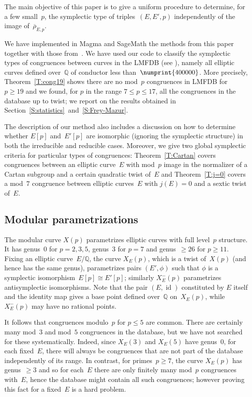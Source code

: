 \documentclass[12pt]{amsart}
\newcommand{\Q}{\mathbb{Q}}
\newcommand{\rhobar}{{\overline{\rho}}}
\DeclareMathOperator{\id}{id}
\numberwithin{equation}{section}
\theoremstyle{definition}
\theoremstyle{remark}
\newcommand{\Sage}{{\sc SageMath}}
\newcommand{\Magma}{{\sc Magma}}
\begin{document}
The main objective of this paper is to give a uniform procedure to
determine, for a few small~$p$, the symplectic type of
triples~$(E,E',p)$ independently of the image of~$\rhobar_{E,p}$.

We have implemented in {\Magma} \cite{magma} and {\Sage} \cite{sage}
the methods from this paper together with those from~\cite{FKSym}. We
have used our code to classify the symplectic types of congruences
between curves in the LMFDB (see \cite{lmfdb}), namely all elliptic
curves defined over~$\Q$ of conductor less
than~$\numprint{400000}$. More precisely, Theorem~\ref{T:cong19} shows
there are no mod~$p$ congruences in LMFDB for $p \geq 19$ and we
found, for $p$ in the range $7 \leq p \leq 17$, all the congruences in
the database up to twist; we report on the results obtained in
Section~\ref{S:statistics}~and~\ref{S:Frey-Mazur}.

The description of our method also includes a discussion on how to
determine whether $E[p]$ and~$E'[p]$ are isomorphic (ignoring the
symplectic structure) in both the irreducible and reducible
cases. Moreover, we give two global symplectic criteria for particular
types of congruences: Theorem~\ref{T:Cartan} covers congruences
between an elliptic curve~$E$ with mod~$p$ image in the normalizer of
a Cartan subgroup and a certain quadratic twist of~$E$ and
Theorem~\ref{T:j=0} covers a mod~$7$ congruence between elliptic
curves~$E$ with $j(E)=0$ and a sextic twist of~$E$.

\subsection{Modular parametrizations}
The modular curve $X(p)$ parametrizes elliptic curves with full
level~$p$ structure. It has genus~$0$ for $p=2,3,5$, genus~$3$ for
$p=7$ and genus~$\ge26$ for $p\ge11$.  Fixing an elliptic
curve~$E/\Q$, the curve $X_E(p)$, which is a twist of~$X(p)$ (and
hence has the same genus), parametrizes pairs $(E',\phi)$ such that
$\phi$ is a symplectic isomorphism~$E[p]\cong E'[p]$; similarly
$X_E^-(p)$ parametrizes antisymplectic isomorphisms. Note that the pair $(E,\id)$ constituted by $E$ itself and the identity map
gives a base point defined over~$\Q$ on~$X_E(p)$, while $X_E^-(p)$ may have no rational points.

It follows that congruences modulo~$p$ for $p\le 5$ are common.  There
are certainly many mod~$3$ and mod~$5$ congruences in the database,
but we have not searched for these systematically. Indeed, since
$X_E(3)$ and $X_E(5)$ have genus~0, for each fixed~$E$, there will
always be congruences that are not part of the database independently
of its range. In contrast, for primes~$p \geq 7$, the curve $X_E(p)$
has genus~$\geq 3$ and so for each~$E$ there are only finitely many
mod~$p$ congruences with~$E$, hence the database
might contain all such congruences; however proving this fact for a
fixed~$E$ is a hard problem.
\end{document}
